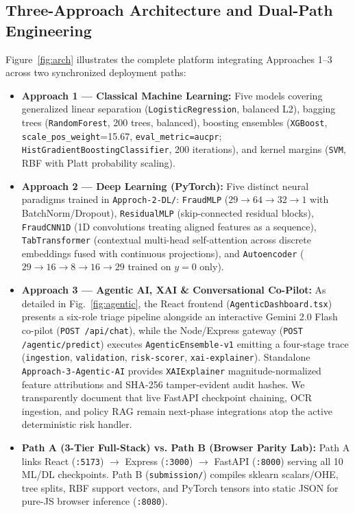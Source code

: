 \documentclass[12pt]{article}
\begin{document}
\subsection{Three-Approach Architecture and Dual-Path Engineering}
Figure~\ref{fig:arch} illustrates the complete platform integrating Approaches 1--3 across two synchronized deployment paths:
\begin{itemize}
    \item \textbf{Approach 1 — Classical Machine Learning:} Five models covering generalized linear separation (\texttt{LogisticRegression}, balanced L2), bagging trees (\texttt{RandomForest}, 200 trees, balanced), boosting ensembles (\texttt{XGBoost}, \texttt{scale\_pos\_weight}=15.67, \texttt{eval\_metric=aucpr}; \texttt{HistGradientBoostingClassifier}, 200 iterations), and kernel margins (\texttt{SVM}, RBF with Platt probability scaling).
    \item \textbf{Approach 2 — Deep Learning (PyTorch):} Five distinct neural paradigms trained in \texttt{Approch-2-DL/}: \texttt{FraudMLP} ($29 \to 64 \to 32 \to 1$ with BatchNorm/Dropout), \texttt{ResidualMLP} (skip-connected residual blocks), \texttt{FraudCNN1D} (1D convolutions treating aligned features as a sequence), \texttt{TabTransformer} (contextual multi-head self-attention across discrete embeddings fused with continuous projections), and \texttt{Autoencoder} ($29 \to 16 \to 8 \to 16 \to 29$ trained on $y=0$ only).
    \item \textbf{Approach 3 — Agentic AI, XAI & Conversational Co-Pilot:} As detailed in Fig.~\ref{fig:agentic}, the React frontend (\texttt{AgenticDashboard.tsx}) presents a six-role triage pipeline alongside an interactive Gemini 2.0 Flash co-pilot (\texttt{POST /api/chat}), while the Node/Express gateway (\texttt{POST /agentic/predict}) executes \texttt{AgenticEnsemble-v1} emitting a four-stage trace (\texttt{ingestion}, \texttt{validation}, \texttt{risk-scorer}, \texttt{xai-explainer}). Standalone \texttt{Approach-3-Agentic-AI} provides \texttt{XAIExplainer} magnitude-normalized feature attributions and SHA-256 tamper-evident audit hashes. We transparently document that live FastAPI checkpoint chaining, OCR ingestion, and policy RAG remain next-phase integrations atop the active deterministic risk handler.
    \item \textbf{Path A (3-Tier Full-Stack) vs. Path B (Browser Parity Lab):} Path A links React (\texttt{:5173}) $\to$ Express (\texttt{:3000}) $\to$ FastAPI (\texttt{:8000}) serving all 10 ML/DL checkpoints. Path B (\texttt{submission/}) compiles sklearn scalars/OHE, tree splits, RBF support vectors, and PyTorch tensors into static JSON for pure-JS browser inference (\texttt{:8080}).
\end{itemize}
\end{document}
